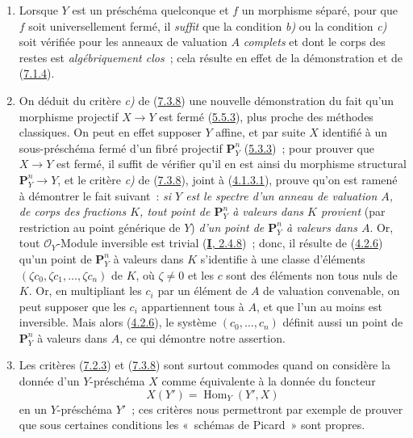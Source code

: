 \begin{remark}[7.3.9]
\label{II.7.3.9-fr}
\begin{enumerate}
\item[\rm (i)] Lorsque $Y$ est un préschéma quelconque et $f$ un morphisme
séparé, pour que $f$ soit universellement fermé, il \emph{suffit} que la
condition \emph{b)} ou la condition \emph{c)} soit vérifiée pour les anneaux de valuation
$A$ \emph{complets} et dont le corps des restes est \emph{algébriquement
clos}~; cela résulte en effet de la démonstration et de
(\hyperref[II.7.1.4-fr]{7.1.4}).
\item[\rm (ii)] On déduit du critère \emph{c)} de
(\hyperref[II.7.3.8-fr]{7.3.8}) une nouvelle démonstration du fait qu'un
morphisme projectif $X\to Y$ est fermé (\hyperref[II.5.5.3-fr]{5.5.3}), plus
proche des méthodes classiques. On peut en effet supposer $Y$ affine, et par
suite $X$ identifié à un sous-préschéma fermé d'un fibré projectif
$\mathbf{P}_Y^n$ (\hyperref[II.5.3.3-fr]{5.3.3})~; pour prouver que $X\to Y$
est fermé, il suffit de vérifier qu'il en est ainsi du morphisme structural
$\mathbf{P}_Y^n\to Y$, et le critère \emph{c)} de
(\hyperref[II.7.3.8-fr]{7.3.8}), joint à
(\hyperref[II.4.1.3.1-fr]{4.1.3.1}), prouve qu'on est ramené à démontrer le
fait suivant~: \emph{si $Y$ est le spectre d'un anneau de valuation $A$, de
corps des fractions $K$, tout point de $\mathbf{P}_Y^n$ à valeurs dans $K$
provient} (par restriction au point générique de $Y$) \emph{d'un point de
$\mathbf{P}_Y^n$ à valeurs dans $A$}. Or, tout $\mathcal{O}_Y$-Module
inversible est trivial (\hyperref[I.2.4.8-fr]{\textbf{I}, 2.4.8})~; donc, il résulte de
(\hyperref[II.4.2.6-fr]{4.2.6}) qu'un point de $\mathbf{P}_Y^n$ à valeurs dans
$K$ s'identifie à une classe d'éléments $(\zeta c_0,\zeta c_1,\ldots,\zeta
c_n)$ de $K$, où $\zeta\neq0$ et les $c$ sont des éléments non tous nuls de
$K$. Or, en multipliant les $c_i$ par un élément de $A$ de
valuation convenable, on peut supposer que les $c_i$ appartiennent tous à
$A$, et que l'un au moins est inversible. Mais alors
(\hyperref[II.4.2.6-fr]{4.2.6}), le système $(c_0,\ldots,c_n)$ définit aussi
un point de $\mathbf{P}_Y^n$ à valeurs dans $A$, ce qui démontre notre
assertion.
\item[\rm (iii)] Les critères (\hyperref[II.7.2.3-fr]{7.2.3}) et
(\hyperref[II.7.3.8-fr]{7.3.8}) sont surtout commodes quand on considère la
donnée d'un $Y$-préschéma $X$ comme équivalente à la donnée du foncteur
\[
X(Y')=\operatorname{Hom}_Y(Y',X)
\]
en un $Y$-préschéma $Y'$~; ces critères nous permettront par exemple de
prouver que sous certaines conditions les «~schémas de Picard~» sont propres.
\end{enumerate}
\end{remark}

